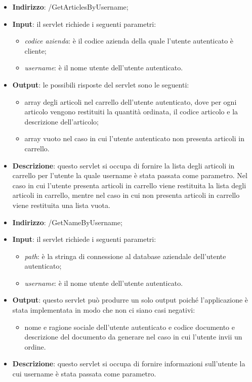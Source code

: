
\begin{itemize}
	\item \textbf{Indirizzo}: /GetArticlesByUsername;
	\item \textbf{Input}: il servlet richiede i seguenti parametri:
		\begin{itemize}
			\item \textit{codice azienda}: è il codice azienda della quale l'utente autenticato è cliente;
			\item \textit{username}: è il nome utente dell'utente autenticato.
		\end{itemize}
	\item \textbf{Output}: le possibili risposte del servlet sono le seguenti:
		\begin{itemize}
			\item array degli articoli nel carrello dell'utente autenticato, dove per ogni articolo vengono restituiti la quantità ordinata, il codice articolo e la descrizione dell'articolo;
			\item array vuoto nel caso in cui l'utente autenticato non presenta articoli in carrello.
		\end{itemize}
	\item \textbf{Descrizione}: questo servlet si occupa di fornire la lista degli articoli in carrello per l'utente la quale username è stata passata come parametro. Nel caso in cui l'utente presenta articoli in carrello viene restituita la lista degli articoli in carrello, mentre nel caso in cui non presenta articoli in carrello viene restituita una lista vuota.
\end{itemize}


\begin{itemize}
	\item \textbf{Indirizzo}: /GetNameByUsername;
	\item \textbf{Input}: il servlet richiede i seguenti parametri:
		\begin{itemize}
			\item \textit{path}: è la stringa di connessione al database aziendale dell'utente autenticato;
			\item \textit{username}: è il nome utente dell'utente autenticato.
		\end{itemize}
	\item \textbf{Output}: questo servlet può produrre un solo output poiché l'applicazione è stata implementata in modo che non ci siano casi negativi:
		\begin{itemize}
			\item nome e ragione sociale dell'utente autenticato e codice documento e descrizione del documento da generare nel caso in cui l'utente invii un ordine.
		\end{itemize}
	\item \textbf{Descrizione}: questo servlet si occupa di fornire informazioni sull'utente la cui username è stata passata come parametro.
\end{itemize}

